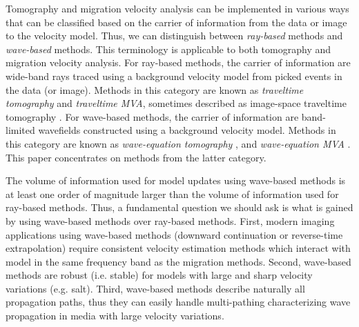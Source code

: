 Tomography and migration velocity analysis can be implemented in
various ways that can be classified based on the carrier of
information from the data or image to the velocity model. Thus, we can
distinguish between \textit{ray-based} methods and \textit{wave-based}
methods. This terminology is applicable to both tomography and
migration velocity analysis.
For ray-based methods, the carrier of information are wide-band rays
traced using a background velocity model from picked events in the
data (or image). Methods in this category are known as
\textit{traveltime tomography} \cite[]{GEO50-06-09030923} and
\textit{traveltime MVA}, sometimes described as image-space traveltime
tomography
\cite[]{GEO57-05-06800692,AlYahya.thesis,Fowler.thesis,Etgen.thesis,GEO60-02-04760490,GEO66-03-08450860,GEO67-04-12021212,GEO67-04-12131224,GEO68-03-10081021,GPR52-06-06710681,GEO69-02-05330546}.
For wave-based methods, the carrier of information are band-limited
wavefields constructed using a background velocity model. Methods in
this category are known as \textit{wave-equation tomography}
\cite[]{GEO51-07-13871403,tarantola.elsevier,GEO54-12-15751586,GEO57-01-00150026,GEO64-03-08880901,2004_Pratt_BPsalt},
and \textit{wave-equation MVA}
\cite[]{BiondiSava.segab.1999,SavaBiondi.gp.wemva1,SavaBiondi.gp.wemva2,ShenSymes.segab.2005,Albertin.eageab.2006,MaharramovAlbertin.segab.2007}.
This paper concentrates on methods from the latter category.


The volume of information used for model updates using wave-based
methods is at least one order of magnitude larger than the volume of
information used for ray-based methods. Thus, a fundamental
question we should ask is what is gained by using wave-based
methods over ray-based methods. First, modern imaging
applications using wave-based methods (downward continuation or
reverse-time extrapolation) require consistent velocity estimation
methods which interact with model in the same frequency band as the
migration methods. Second, wave-based methods are robust
(i.e. stable) for models with large and sharp velocity variations
(e.g. salt). Third, wave-based methods describe naturally all
propagation paths, thus they can easily handle multi-pathing
characterizing wave propagation in media with large velocity
variations.


